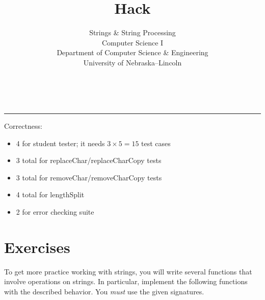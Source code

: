 \documentclass[12pt]{scrartcl}
\title{Hack}\let\Title\@title
\subtitle{Strings \& String Processing\\
Computer Science I\\
{\small
\vskip1cm
Department of Computer Science \& Engineering \\
University of Nebraska--Lincoln}
\vskip-1cm}
\date{~}
\begin{document}
\maketitle

\hrule



Correctness:
\begin{itemize}
  \item 4 for student tester; it needs $3 \times 5 = 15$ test cases 
  \item 3 total for replaceChar/replaceCharCopy tests
  \item 3 total for removeChar/removeCharCopy tests
  \item 4 total for lengthSplit
  \item 2 for error checking suite
\end{itemize}


\section*{Exercises}

To get more practice working with strings, you will write several 
functions that involve operations on strings.  In particular, implement
the following functions with the described behavior.  You \emph{must}
use the given signatures.
\end{document}
